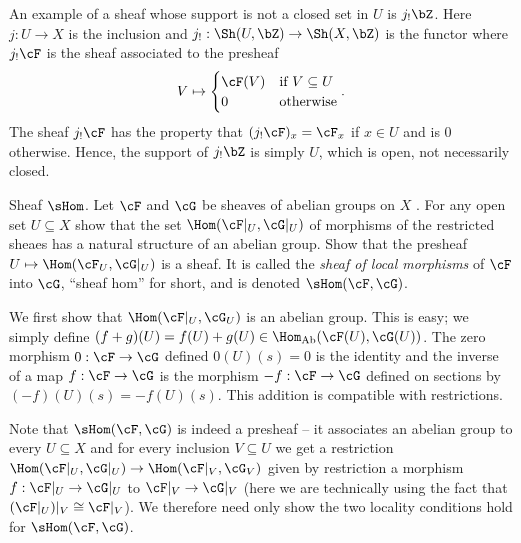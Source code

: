 \begin{homework}[e]
\begin{prf}
		An example of a sheaf whose support is not a closed set in $U$ is $j_!\bZ$. Here $j:U\to X$ is the inclusion and $j_!:\Sh(U,\bZ)\to \Sh(X,\bZ)$ is the functor where $j_!\cF$ is the sheaf associated to the presheaf
		\begin{align*}
			V \mapsto
			\begin{cases}
				\cF(V) &\text{if } V\subseteq U \\
				0 & \text{otherwise}
			\end{cases}.
		\end{align*}
		The sheaf $j_!\cF$ has the property that $(j_!\cF)_x = \cF_x$ if $x \in U$ and is $0$ otherwise. Hence, the support of $j_!\bZ$ is simply $U$, which is open, not necessarily closed.
	\end{prf}
	 Sheaf $\sHom$. Let $\cF$ and $\cG$ be sheaves of abelian groups on $X$ . For any open set $U\subseteq X$ show that the set $\Hom(\cF|_U,\cG|_U)$ of morphisms of the restricted sheaes has a natural structure of an abelian group. Show that the presheaf $U\mapsto \Hom(\cF_U,\cG|_U)$ is a sheaf. It is called the \emph{sheaf of local morphisms} of $\cF$ into $\cG$, ``sheaf hom'' for short, and is denoted $\sHom(\cF,\cG)$.
	\begin{prf}
		We first show that $\Hom(\cF|_U,\cG_U)$ is an abelian group. This is easy; we simply define $(f+g)(U) = f(U) + g(U) \in \Hom_{\text{Ab}}(\cF(U), \cG(U))$. The zero morphism $0:\cF\to \cG$ defined $0(U)(s) = 0$ is the identity and the inverse of a map $f:\cF\to \cG$ is the morphism $-f:\cF\to \cG$ defined on sections by $(-f)(U)(s) = -f(U)(s)$. This addition is compatible with restrictions.

		Note that $\sHom(\cF,\cG)$ is indeed a presheaf -- it associates an abelian group to every $U\subseteq X$ and for every inclusion $V\subseteq U$ we get a restriction $\Hom(\cF|_U,\cG|_U) \to \Hom(\cF|_V,\cG_V)$ given by restriction a morphism $f:\cF|_U\to \cG|_U$ to $\cF|_V\to \cG|_V$ (here we are technically using the fact that $(\cF|_U)|_V \cong \cF|_V$). We therefore need only show the two locality conditions hold for $\sHom(\cF,\cG)$.

		\bigskip


\end{prf}
\end{homework}
